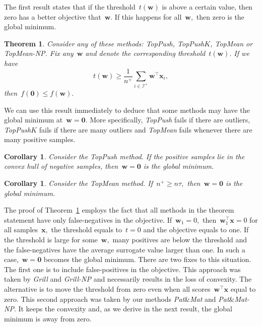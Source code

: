 \documentclass[11pt,a4paper]{article}
\newtheorem{theorem}[thm]{Theorem}
\newtheorem{corollary}[thm]{Corollary}
\theoremstyle{definition}
\newcommand{\I}{\mathcal{I}}
\newcommand{\toppush}{\textit{TopPush}\xspace}
\newcommand{\toppushk}{\textit{TopPush$K$}\xspace}
\newcommand{\grill}{\textit{Grill}\xspace}
\newcommand{\patmat}{\textit{Pat}\textup{\&}\textit{Mat}\xspace}
\newcommand{\topmean}{\textit{TopMean}\xspace}
\newcommand{\grillnp}{\textit{Grill-NP}\xspace}
\newcommand{\patmatnp}{\textit{Pat}\textup{\&}\textit{Mat-NP}\xspace}
\newcommand{\topmeannp}{\textit{TopMean-NP}\xspace}
\begin{document}
The first result states that if the threshold~$t(\bm{w})$ is above a certain value, then zero has a better objective that~$\bm{w}.$ If this happens for all~$\bm{w},$ then zero is the global minimum.

\begin{theorem}\label{thm:large_t}
  Consider any of these methods: \toppush, \toppushk, \topmean or \topmeannp. Fix any~$\bm{w}$ and denote the corresponding threshold~$t(\bm{w}).$ If we have
  \begin{equation*}
    t(\bm{w})\ge \frac{1}{n^+} \sum_{i \in \I^+} \bm{w}^\top \bm{x}_i,
  \end{equation*}
  then~$f(\bm{0})\le f(\bm{w}).$
\end{theorem}

\noindent We can use this result immediately to deduce that some methods may have the global minimum at~$\bm{w}=\bm{0}.$ More specifically, \toppush fails if there are outliers, \toppushk fails if there are many outliers and \topmean fails whenever there are many positive samples.

\begin{corollary}\label{cor:toppush}
  Consider the \toppush method. If the positive samples lie in the convex hull of negative samples, then~$\bm{w}=\bm{0}$ is the global minimum.
\end{corollary}

\begin{corollary}\label{cor:topmean}
  Consider the \topmean method. If~$n^+\ge n\tau,$ then~$\bm{w}=\bm{0}$ is the global minimum.
\end{corollary}

The proof of Theorem~\ref{thm:large_t} employs the fact that all methods in the theorem statement have only false-negatives in the objective. If~$\bm{w}_1=0,$ then~$\bm{w}_1^\top \bm{x}=0$ for all samples~$\bm{x},$ the threshold equals to~$t=0$ and the objective equals to one. If the threshold is large for some~$\bm{w},$ many positives are below the threshold and the false-negatives have the average surrogate value larger than one. In such a case,~$\bm{w}=\bm{0}$ becomes the global minimum. There are two fixes to this situation. The first one is to include false-positives in the objective. This approach was taken by \grill and \grillnp and necessarily results in the loss of convexity. The alternative is to move the threshold from zero even when all scores~$\bm{w}^\top \bm{x}$ equal to zero. This second approach was taken by our methods \patmat and \patmatnp. It keeps the convexity and, as we derive in the next result, the global minimum is away from zero.
\end{document}
